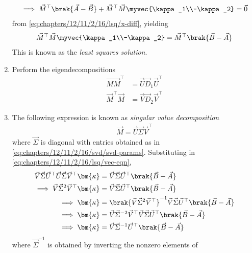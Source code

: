 \begin{enumerate}[label=\thesubsection.\arabic*.,ref=\thesubsection.\theenumi]
\begin{align}
	    \\
	    \implies \vec{M}^\top
	    \brak{\vec{A}-\vec{B}}+
 \vec{M}^\top\vec{M}\myvec{\kappa_1\\-\kappa_2} = \vec{0}
	    \label{eq:chapters/12/11/2/16/lsq/m-orth}
    \end{align}
	    from 
	\eqref{eq:chapters/12/11/2/16/lsq/x-diff},
	yielding
    \begin{align}
	    \vec{M}^\top\vec{M}\myvec{\kappa_1\\-\kappa_2} = \vec{M}^\top\brak{\vec{B}-\vec{A}}
        \label{eq:chapters/12/11/2/16/lsq/vec-eqn}
    \end{align}
    This is known as the {\em least squares solution}.
	\item Perform the eigendecompositions 
    \begin{align}
	    \vec{MM}^\top &= \vec{U}\vec{D}_1\vec{U}^\top \label{eq:chapters/12/11/2/16/svd/decomp-1} \\
	    \vec{M}^\top\vec{M} &= \vec{V}\vec{D}_2\vec{V}^\top \label{eq:chapters/12/11/2/16/svd/decomp-2}
    \end{align}
	\item    The following expression is known as {\em singular value decomposition}
    \begin{align}
        \vec{M} = 
	\vec{U}\vec{\Sigma}\vec{V}^\top
        \label{eq:chapters/12/11/2/16/svd/M-svd}
    \end{align}
    where $\vec{\Sigma}$ is diagonal with
    entries obtained as in 
        \eqref{eq:chapters/12/11/2/16/svd/svd-params}.
 Substituting in 
        \eqref{eq:chapters/12/11/2/16/lsq/vec-eqn},
	\begin{align}
\vec{V}\vec{\Sigma}\vec{U}^\top\vec{U}\vec{\Sigma}\vec{V}^\top\bm{\kappa} &= \vec{V}\vec{\Sigma}\vec{U}^\top\brak{\vec{B}-\vec{A}} \\
\implies \vec{V}\vec{\Sigma}^2\vec{V}^\top\bm{\kappa} &= \vec{V}\vec{\Sigma}\vec{U}^\top\brak{\vec{B}-\vec{A}} \\
\implies \bm{\kappa} &= \brak{\vec{V}\vec{\Sigma}^2\vec{V}^\top}^{-1}\vec{V}\vec{\Sigma}\vec{U}^\top\brak{\vec{B}-\vec{A}} \\
\implies \bm{\kappa} &= \vec{V}\vec{\Sigma}^{-2}\vec{V}^\top\vec{V}\vec{\Sigma}\vec{U}^\top\brak{\vec{B}-\vec{A}} \\
\implies \bm{\kappa} &= \vec{V}\vec{\Sigma}^{-1}\vec{U}^\top\brak{\vec{B}-\vec{A}}
\label{eq:chapters/12/11/2/16/svd/kappa-sol}
\end{align}
    where $\vec{\Sigma}^{-1}$ is obtained by inverting the nonzero elements of

\end{enumerate}

